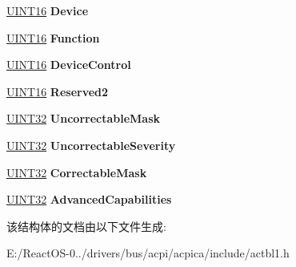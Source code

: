 \begin{DoxyCompactItemize}
\hyperlink{_processor_bind_8h_a09f1a1fb2293e33483cc8d44aefb1eb1}{U\+I\+N\+T16} {\bfseries Device}
\item 
\mbox{\label{structacpi__hest__aer__common_ac9b212234753681471d051caf791600c}} 
\hyperlink{_processor_bind_8h_a09f1a1fb2293e33483cc8d44aefb1eb1}{U\+I\+N\+T16} {\bfseries Function}
\item 
\mbox{\label{structacpi__hest__aer__common_a51ec22a2d2056c18e972016f53304cb4}} 
\hyperlink{_processor_bind_8h_a09f1a1fb2293e33483cc8d44aefb1eb1}{U\+I\+N\+T16} {\bfseries Device\+Control}
\item 
\mbox{\label{structacpi__hest__aer__common_a9949bfaaec9105a4af0d3f94f2f100d9}} 
\hyperlink{_processor_bind_8h_a09f1a1fb2293e33483cc8d44aefb1eb1}{U\+I\+N\+T16} {\bfseries Reserved2}
\item 
\mbox{\label{structacpi__hest__aer__common_a0da3b6923ca45dd287d0ea050777d7fc}} 
\hyperlink{_processor_bind_8h_ae1e6edbbc26d6fbc71a90190d0266018}{U\+I\+N\+T32} {\bfseries Uncorrectable\+Mask}
\item 
\mbox{\label{structacpi__hest__aer__common_a179b6fa51ffaf93a4be34e32e7add959}} 
\hyperlink{_processor_bind_8h_ae1e6edbbc26d6fbc71a90190d0266018}{U\+I\+N\+T32} {\bfseries Uncorrectable\+Severity}
\item 
\mbox{\label{structacpi__hest__aer__common_a60430904e1c45ce53c84befea8f84bf5}} 
\hyperlink{_processor_bind_8h_ae1e6edbbc26d6fbc71a90190d0266018}{U\+I\+N\+T32} {\bfseries Correctable\+Mask}
\item 
\mbox{\label{structacpi__hest__aer__common_a360975aeab018f14337f1981712ee842}} 
\hyperlink{_processor_bind_8h_ae1e6edbbc26d6fbc71a90190d0266018}{U\+I\+N\+T32} {\bfseries Advanced\+Capabilities}
\end{DoxyCompactItemize}


该结构体的文档由以下文件生成\+:\begin{DoxyCompactItemize}
\item 
E\+:/\+React\+O\+S-\/0../drivers/bus/acpi/acpica/include/actbl1.\+h\end{DoxyCompactItemize}
